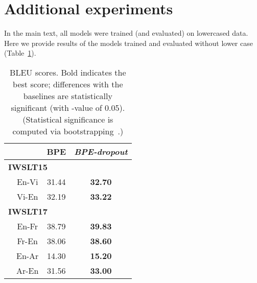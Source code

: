 \documentclass[11pt,a4paper]{article}
\begin{document}
\section{Additional experiments}

In the main text, all models were trained (and evaluated) on lowercased data. Here we provide results of the models trained and evaluated without lower case (Table~\ref{tab:main_no_lowersace}).

\begin{table}[h!]
\centering
\begin{tabular}{lccc}
\toprule
& & BPE  & \textit{BPE-dropout}\\

\midrule
\multicolumn{4}{l}{\!\!\!\bf IWSLT15}\\
& En-Vi & 31{.}44 & \bf{32{.}70} \\
& Vi-En & 32{.}19 & \bf{33{.}22} \\
\midrule
\multicolumn{4}{l}{\!\!\!\bf IWSLT17}\\
& En-Fr & 38{.}79 &	\bf{39{.}83} \\
& Fr-En & 38{.}06 &	\bf{38{.}60} \\
& En-Ar & 14.30 & \bf{15.20} \\
& Ar-En & 31.56 & \bf{33.00} \\

\bottomrule
\end{tabular}
\caption{BLEU scores. Bold indicates the best score; differences with the baselines are statistically significant (with -value of 0.05). (Statistical significance is computed via bootstrapping~\cite{koehn2004statistical}.)}
\label{tab:main_no_lowersace}
\end{table} 
\end{document}
